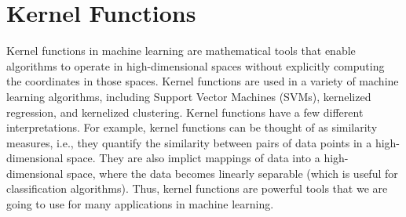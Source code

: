 \documentclass{article}[11pt]
\begin{document}
\section{Kernel Functions}
Kernel functions in machine learning are mathematical tools that enable algorithms to operate in high-dimensional spaces without explicitly computing the coordinates in those spaces.
Kernel functions are used in a variety of machine learning algorithms, including Support Vector Machines (SVMs), kernelized regression, and kernelized clustering.
Kernel functions have a few different interpretations. 
For example, kernel functions can be thought of as similarity measures, i.e., they quantify the similarity between pairs of data points in a high-dimensional space.
They are also implict mappings of data into a high-dimensional space, where the data becomes linearly separable (which is useful for classification algorithms).
Thus, kernel functions are powerful tools that we are going to use for many applications in machine learning.
\end{document}
